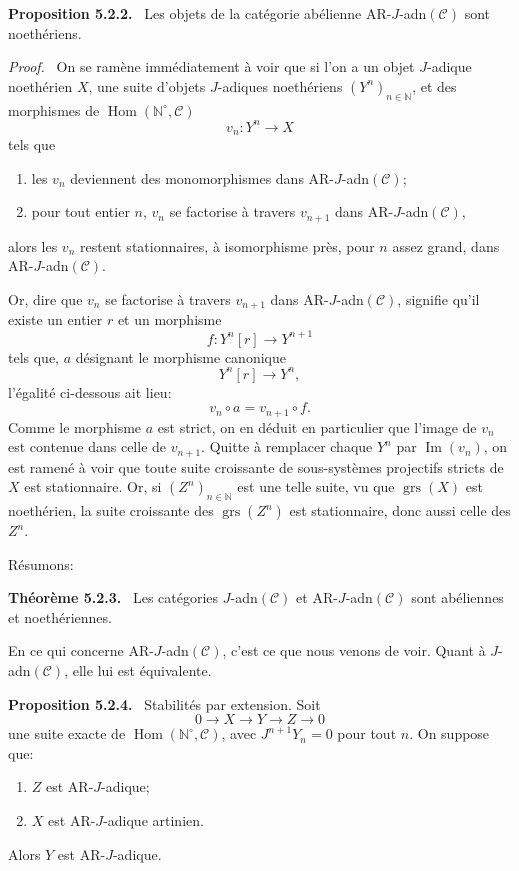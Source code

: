 \documentclass[11pt]{article}
\newenvironment{statement}[1]{\par\medskip\noindent\textbf{#1.}\ }{\par\medskip}
\newenvironment{prooftext}[1][Proof]{\par\noindent\emph{#1.}\ }{\par\medskip}
\DeclareMathOperator{\Hom}{Hom}
\providecommand{\Hom}{\operatorname{Hom}}
\providecommand{\Im}{\operatorname{Im}}
\renewcommand{\Im}{\operatorname{Im}}
\providecommand{\grs}{\operatorname{grs}}
\providecommand{\Im}{\operatorname{Im}}
\providecommand{\Hom}{\operatorname{Hom}}
\begin{document}
\begin{statement}{Proposition 5.2.2}
Les objets de la catégorie abélienne AR-\(J\)-adn\((\mathcal C)\) sont noethériens.
\end{statement}

\begin{prooftext}
On se ramène immédiatement à voir que si l'on a un objet \(J\)-adique noethérien \(X\), une suite d'objets \(J\)-adiques noethériens \((Y^n)_{n\in\mathbb N}\), et des morphismes de \(\Hom(\mathbb N^\circ,\mathcal C)\)
\[
v_n:Y^n\longrightarrow X
\]
tels que
\begin{enumerate}[label=\textup{(\roman*)}]
\item les \(v_n\) deviennent des monomorphismes dans AR-\(J\)-adn\((\mathcal C)\);
\item pour tout entier \(n\), \(v_n\) se factorise à travers \(v_{n+1}\) dans AR-\(J\)-adn\((\mathcal C)\),
\end{enumerate}
alors les \(v_n\) restent stationnaires, à isomorphisme près, pour \(n\) assez grand, dans AR-\(J\)-adn\((\mathcal C)\).

Or, dire que \(v_n\) se factorise à travers \(v_{n+1}\) dans AR-\(J\)-adn\((\mathcal C)\), signifie qu'il existe un entier \(r\) et un morphisme
\[
f:Y^n[r]\longrightarrow Y^{n+1}
\]
tels que, \(a\) désignant le morphisme canonique
\[
Y^n[r]\longrightarrow Y^n,
\]
l'égalité ci-dessous ait lieu:
\[
v_n\circ a=v_{n+1}\circ f .
\]
Comme le morphisme \(a\) est strict, on en déduit en particulier que l'image de \(v_n\) est contenue dans celle de \(v_{n+1}\). Quitte à remplacer chaque \(Y^n\) par \(\Im(v_n)\), on est ramené à voir que toute suite croissante de sous-systèmes projectifs stricts de \(X\) est stationnaire. Or, si \((Z^n)_{n\in\mathbb N}\) est une telle suite, vu que \(\grs(X)\) est noethérien, la suite croissante des \(\grs(Z^n)\) est stationnaire, donc aussi celle des \(Z^n\).
\end{prooftext}

Résumons:

\begin{statement}{Théorème 5.2.3}
Les catégories \(J\)-adn\((\mathcal C)\) et AR-\(J\)-adn\((\mathcal C)\) sont abéliennes et noethériennes.
\end{statement}

En ce qui concerne AR-\(J\)-adn\((\mathcal C)\), c'est ce que nous venons de voir. Quant à \(J\)-adn\((\mathcal C)\), elle lui est équivalente.

\begin{statement}{Proposition 5.2.4}
Stabilités par extension. Soit
\[
0\longrightarrow X\longrightarrow Y\longrightarrow Z\longrightarrow0
\]
une suite exacte de \(\Hom(\mathbb N^\circ,\mathcal C)\), avec \(J^{n+1}Y_n=0\) pour tout \(n\). On suppose que:
\begin{enumerate}[label=\textup{(\roman*)}]
\item \(Z\) est AR-\(J\)-adique;
\item \(X\) est AR-\(J\)-adique artinien.
\end{enumerate}
Alors \(Y\) est AR-\(J\)-adique.
\end{statement}
\end{document}
